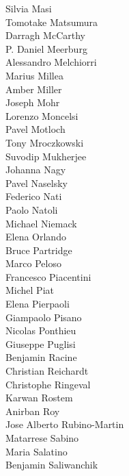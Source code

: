 \documentclass[PICOAPC.tex]{subfiles}
\begin{document}
{\begin{multicols}{4}
Silvia Masi                     \\
Tomotake Matsumura              \\
Darragh McCarthy                \\
P. Daniel Meerburg              \\
Alessandro Melchiorri           \\
Marius Millea                   \\
Amber Miller                    \\
Joseph Mohr                     \\
Lorenzo Moncelsi                \\
Pavel Motloch                   \\
Tony Mroczkowski                \\
Suvodip Mukherjee               \\
Johanna Nagy                    \\
Pavel Naselsky                  \\
Federico Nati                   \\
Paolo Natoli                    \\
Michael Niemack                 \\
Elena Orlando                   \\
Bruce Partridge                 \\
Marco Peloso                    \\
Francesco Piacentini            \\
Michel Piat                     \\
Elena Pierpaoli   \\
Giampaolo Pisano                \\
Nicolas Ponthieu                \\
Giuseppe Puglisi                \\
Benjamin Racine                 \\
Christian Reichardt             \\
Christophe Ringeval             \\
Karwan Rostem                   \\
Anirban Roy                     \\
Jose Alberto Rubino-Martin      \\
Matarrese Sabino                \\
Maria Salatino                  \\
Benjamin Saliwanchik            \\

\end{multicols}}
\end{document}
